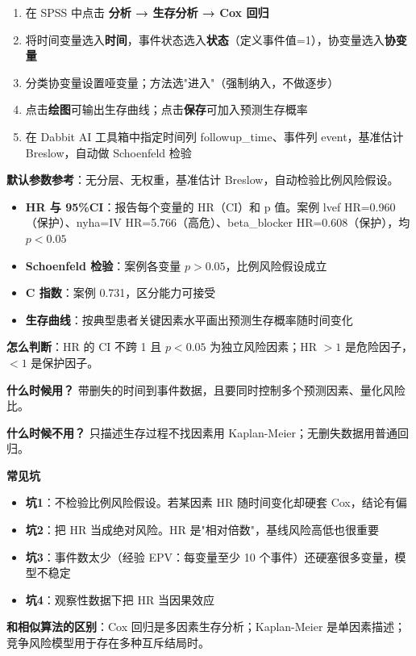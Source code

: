 \begin{algosposs}
\begin{enumerate}
    \item 在 SPSS 中点击 \textbf{分析 → 生存分析 → Cox 回归}
    \item 将时间变量选入\textbf{时间}，事件状态选入\textbf{状态}（定义事件值=1），协变量选入\textbf{协变量}
    \item 分类协变量设置哑变量；方法选"进入"（强制纳入，不做逐步）
    \item 点击\textbf{绘图}可输出生存曲线；点击\textbf{保存}可加入预测生存概率
    \item 在 Dabbit AI 工具箱中指定时间列 followup\_time、事件列 event，基准估计 Breslow，自动做 Schoenfeld 检验
\end{enumerate}

\textbf{默认参数参考}：无分层、无权重，基准估计 Breslow，自动检验比例风险假设。
\end{algosposs}

\begin{algoresult}
\begin{itemize}
    \item \textbf{HR 与 95\%CI}：报告每个变量的 HR（CI）和 p 值。案例 lvef HR=0.960（保护）、nyha=IV HR=5.766（高危）、beta\_blocker HR=0.608（保护），均 $p<0.05$
    \item \textbf{Schoenfeld 检验}：案例各变量 $p>0.05$，比例风险假设成立
    \item \textbf{C 指数}：案例 0.731，区分能力可接受
    \item \textbf{生存曲线}：按典型患者关键因素水平画出预测生存概率随时间变化
\end{itemize}

\textbf{怎么判断}：HR 的 CI 不跨 1 且 $p<0.05$ 为独立风险因素；HR $>1$ 是危险因子，$<1$ 是保护因子。
\end{algoresult}

\begin{algonotes}
\textbf{什么时候用？} 带删失的时间到事件数据，且要同时控制多个预测因素、量化风险比。

\textbf{什么时候不用？} 只描述生存过程不找因素用 Kaplan-Meier；无删失数据用普通回归。

\textbf{常见坑}
\begin{itemize}
    \item \textbf{坑1}：不检验比例风险假设。若某因素 HR 随时间变化却硬套 Cox，结论有偏
    \item \textbf{坑2}：把 HR 当成绝对风险。HR 是"相对倍数"，基线风险高低也很重要
    \item \textbf{坑3}：事件数太少（经验 EPV：每变量至少 10 个事件）还硬塞很多变量，模型不稳定
    \item \textbf{坑4}：观察性数据下把 HR 当因果效应
\end{itemize}

\textbf{和相似算法的区别}：Cox 回归是多因素生存分析；Kaplan-Meier 是单因素描述；竞争风险模型用于存在多种互斥结局时。
\end{algonotes}

